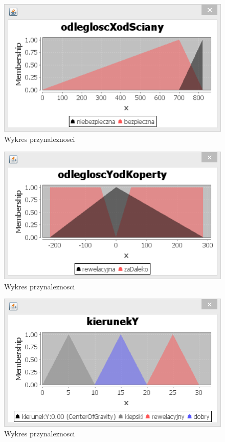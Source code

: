 \documentclass{classrep}
\begin{document}
\begin{figure}[ht]
\centering
			\includegraphics[scale=1.00]{pictures/Obraz03.png}
	\caption{Wykres przynaleznosci}
	\label{fig:Wykres przynaleznosci}
\end{figure}

\begin{figure}[ht]
\centering
			\includegraphics[scale=1.00]{pictures/Obraz04.png}
	\caption{Wykres przynaleznosci}
	\label{fig:Wykres przynaleznosci}
\end{figure}

\begin{figure}[ht]
\centering
			\includegraphics[scale=1.00]{pictures/Obraz05.png}
	\caption{Wykres przynaleznosci}
	\label{fig:Wykres przynaleznosci}
\end{figure}
\end{document}
